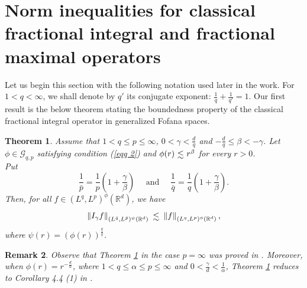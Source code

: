 \documentclass[10pt,a4paper]{amsart}
\numberwithin{equation}{section}
\newtheorem{theorem}{Theorem}[section]
\newtheorem{remark}[theorem]{Remark}
\numberwithin{equation}{section}
\def\lsim{\raisebox{-1ex}{$~\stackrel{\textstyle <}{\sim}~$}}
\begin{document}
\section{Norm inequalities for classical fractional integral and fractional maximal operators}
\label{S3}
Let us begin this section with the following notation used later in the work. For $1<q<\infty$, we shall denote by $q'$ its conjugate exponent: $\frac{1}{q}+\frac{1}{q'}=1$. Our first result is the below theorem stating the boundedness property of the classical fractional integral operator in generalized Fofana spaces.  
\begin{theorem}\label{theo 2}
Assume that $1 < q\leq p \leq \infty$, $ 0 < \gamma < \frac{d}{q}$ and $-\frac{d}{q} \leq \beta  < -\gamma $. Let $\phi\in \mathcal{G}_{q,p}$ satisfying condition (\ref{eqq 2}) and $\phi(r) \lsim  r^{\beta}$ for every $r > 0$. \\ Put $$\frac{1}{\bar{p}} = \frac{1}{p}\left(1 +\frac{\gamma}{\beta}\right) \quad \text{ and } \quad \frac{1}{\bar{q}} = \frac{1}{q}\left(1 +\frac{\gamma}{\beta}\right). $$
 Then, for all  $f \in (L^{q},L^{p})^{\phi}(\mathbb{R}^{d})$, we have
 $$\left\Vert I_{\gamma}f \right\Vert_{(L^{\bar{q}},L^{\bar{p}})^{\psi}(\mathbb{R}^{d})} \lsim  \left\Vert f  \right\Vert_{(L^{q},L^{p})^{\phi}(\mathbb{R}^{d})},$$ where  $\psi(r)= (\phi(r))^{\frac{q}{\bar{q}}}$.
\end{theorem}
\begin{remark}
Observe that Theorem \ref{theo 2} in the case $p=\infty$ was proved in \cite[Theorem 2.2]{GE}. Moreover,
when $\phi (r) = r^{-\frac{d}{\alpha}}$, where $1<q \leq \alpha \leq  p\leq \infty$ and $ 0< \frac{\gamma}{d} < \frac{1}{\alpha}$, Theorem \ref{theo 2} reduces to Corollary 4.4 (1) in \cite{JF}. 
\end{remark}
\end{document}
